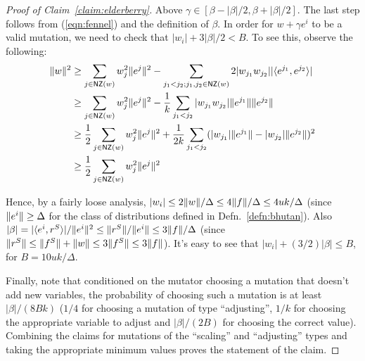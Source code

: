 \begin{proof}[Proof of Claim~\ref{claim:elderberry}]
Above $\gamma \in [\beta - |\beta|/2, \beta + |\beta|/2]$. The last step follows
from (\ref{eqn:fennel}) and the definition of $\beta$.
In order for $w + \gamma e^i$ to be a valid mutation, we need to check that
$|w_i| + 3 |\beta|/2 < B$. To see this, observe the following:
\begin{align*}
\ltwonorm{w}^2 &\geq \sum_{j \in \NZ(w)} w_j^2 \ltwonorm{e^j}^2 - \sum_{j_1 < j_2; j_1,
j_2 \in \NZ(w)} 2 |w_{j_1} w_{j_2}| |\ip{e^{j_1}}{e^{j_2}}| \\
&\geq \sum_{j \in \NZ(w)} w_j^2 \ltwonorm{e^j}^2 - \frac{1}{k} \sum_{j_1 < j_2}
|w_{j_1} w_{j_2}| \ltwonorm{e^{j_1}}\ltwonorm{e^{j_2}} \\
&\geq \frac{1}{2} \sum_{j \in \NZ(w)} w_j^2 \ltwonorm{e^j}^2 + \frac{1}{2k} \sum_{j_1 < j_2}
(|w_{j_1}| \ltwonorm{e^{j_1}} - |w_{j_2}| \ltwonorm{e^{j_2}})^2 \\
&\geq \frac{1}{2} \sum_{j \in \NZ(w)} w_j^2 \ltwonorm{e^j}^2 %
\end{align*}

\noindent Hence, by a fairly loose analysis, $|w_i|  \leq 2 \Vert w \Vert/\Delta
\leq 4 \Vert f \Vert/\Delta \leq 4uk/\Delta$ (since $\Vert e^i \Vert \geq \Delta$
for the class of distributions defined in Defn.~\ref{defn:bhutan}). Also
$|\beta| = |\langle e^i, r^S \rangle|/\Vert e^i \Vert^2 \leq \Vert r^S \Vert/\Vert e^i \Vert
\leq 3 \Vert f \Vert/\Delta$ (since $\Vert r^S \Vert \leq \Vert f^S \Vert +
\Vert w \Vert \leq 3 \Vert f^S \Vert \leq 3 \Vert f \Vert$). It's easy to see that
$|w_i| + (3/2) |\beta| \leq B$, for $B = 10 uk/\Delta$.

Finally, note that conditioned on the mutator choosing a mutation that doesn't
add new variables, the probability of choosing such a mutation is at least
$|\beta|/(8Bk)$ ($1/4$ for choosing a mutation of type ``adjusting'', $1/k$ for
choosing the appropriate variable to adjust and $|\beta|/(2B)$ for choosing the
correct value). Combining the claims for mutations of the ``scaling'' and
``adjusting'' types and taking the appropriate minimum values proves the
statement of the claim.
\end{proof}

